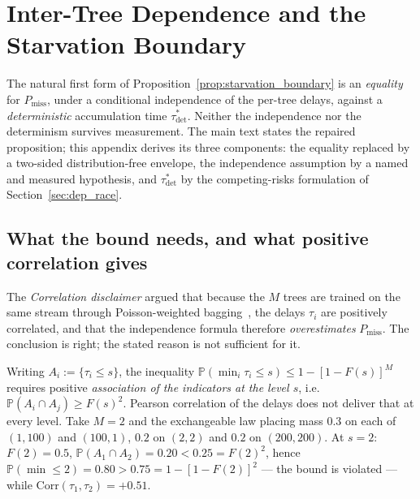 
\section{Inter-Tree Dependence and the Starvation Boundary}\label{sec:dependence}

The natural first form of Proposition~\ref{prop:starvation_boundary} is an \emph{equality} for $P_{\mathrm{miss}}$, under a conditional independence of the per-tree delays, against a \emph{deterministic} accumulation time $\tau_{\mathrm{det}}^*$. Neither the independence nor the determinism survives measurement. The main text
states the repaired proposition; this appendix derives its three components: the equality replaced
by a two-sided distribution-free envelope, the independence assumption by a named and measured
hypothesis, and $\tau_{\mathrm{det}}^*$ by the competing-risks formulation of
Section~\ref{sec:dep_race}.

\subsection{What the bound needs, and what positive correlation gives}\label{sec:dep_correlation}

The \emph{Correlation disclaimer} argued that because the $M$ trees are trained on the same stream
through Poisson-weighted bagging~\cite{gomes_arf_2017}, the delays $\tau_i$ are positively
correlated, and that the independence formula therefore \emph{overestimates} $P_{\mathrm{miss}}$.
The conclusion is right; the stated reason is not sufficient for it.

\begin{remark}\label{rem:corr_insufficient}
  Writing $A_i := \{\tau_i \le s\}$, the inequality
  $\mathbb{P}(\min_i \tau_i \le s) \le 1 - [1 - F(s)]^M$ requires positive \emph{association of the
  indicators at the level $s$}, i.e.\ $\mathbb{P}(A_i \cap A_j) \ge F(s)^2$. Pearson correlation of
  the delays does not deliver that at every level. Take $M = 2$ and the exchangeable law placing
  mass $0.3$ on each of $(1, 100)$ and $(100, 1)$, $0.2$ on $(2,2)$ and $0.2$ on $(200,200)$. At
  $s = 2$: $F(2) = 0.5$, $\mathbb{P}(A_1 \cap A_2) = 0.20 < 0.25 = F(2)^2$, hence
  $\mathbb{P}(\min \le 2) = 0.80 > 0.75 = 1 - [1 - F(2)]^2$ --- the bound is violated --- while
  $\mathrm{Corr}(\tau_1, \tau_2) = +0.51$.
\end{remark}

